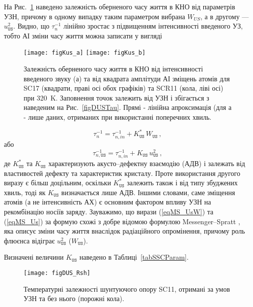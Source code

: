 На Рис.~\ref{figKus} наведено залежність оберненого часу життя в КНО від параметрів УЗН,
причому в одному випадку таким параметром вибрана $W_{U\!S}$, а в другому ---$u_\mathtt{US}^2$.
Видно, що $\tau_n^{-1}$ лінійно зростає з підвищенням інтенсивності введеного УЗ,
тобто АІ зміни часу життя можна записати у вигляді

\begin{figure}
\center
\texttt{[image: figKus\_a]} \hfill
\texttt{[image: figKus\_b]}
\caption{\label{figKus}
Залежність оберненого часу життя в КНО від інтенсивності введеного звуку (а)
та від квадрата амплітуди АІ зміщень атомів для SC17 (квадрати, праві осі обох графіків)
та SCR11 (кола, ліві осі) при 320~K.
Заповнення точок залежить від УЗН і збігається з наведеним на Рис.~\ref{figDUSTau}.
Прямі - лінійна апроксимація (для а - лише даних, отриманих при використанні поперечних хвиль.
}%
\end{figure}

\begin{equation}
\label{eqMS_UsW}
\tau_n^{-1}=\tau_{n,in}^{-1}+K_\mathtt{US}^{*}\,W_\mathtt{US}\,,
\end{equation}
або
\begin{equation}
\label{eqMS_Us}
\tau_{n,\mathtt{US}}^{-1}=\tau_{n,in}^{-1}+K_\mathtt{US}\,u_\mathtt{US}^2 \,,
\end{equation}
де $K_\mathtt{US}^{*}$ та $K_\mathtt{US}$ характеризують акусто--дефектну взаємодію (АДВ) і залежать від властивостей дефекту та характеристик кристалу.
Проте використання  другого виразу є більш доцільним, оскільки $K_\mathtt{US}^{*}$ залежить також і від типу збуджених хвиль,
тоді як $K_\mathtt{US}$ визначається лише АДВ.
Іншими словами, саме зміщення атомів (а не інтенсивність АХ) є основним фактором впливу УЗН на рекомбінацію носіїв заряду.
Зауважимо, що вирази (\ref{eqMS_UsW}) та (\ref{eqMS_Us}) за формую схожі з добре відомою формулою Messenger--Spratt \cite{Markvart},
яка описує зміни часу життя внаслідок радіаційного опромінення, причому роль флюєнса відіграє $u_\mathtt{US}^2$ ($W_\mathtt{US}$).

Визначені величини $K_\mathtt{US}$ наведено в Таблиці~\ref{tabSSCParam}.

\begin{figure}
\center
\texttt{[image: figDUS\_Rsh]}%
\caption{\label{figDUS_Rsh}
Температурні залежності шунтуючого опору SC11, отримані за умов УЗН та без нього (порожні кола).
}%
\end{figure}

